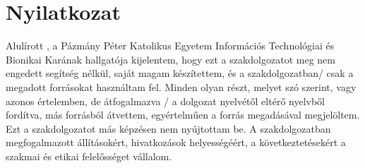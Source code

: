 
\chapter*{Nyilatkozat}
Alulírott \nev, a Pázmány Péter Katolikus Egyetem Információs Technológiai és Bionikai Karának hallgatója kijelentem, hogy ezt a szakdolgozatot meg nem engedett segítség nélkül, saját magam készítettem, és a szakdolgozatban/ csak a megadott forrásokat használtam fel. Minden olyan részt, melyet szó szerint, vagy azonos értelemben, de átfogalmazva / a dolgozat nyelvétől eltérő nyelvből fordítva, más forrásból átvettem, egyértelműen a forrás megadásával megjelöltem. Ezt a szakdolgozatot más képzésen nem nyújtottam be.
A szakdolgozatban megfogalmazott állításokért, hivatkozások helyességéért, a következtetésekért a szakmai és etikai felelősséget vállalom.

\begin{flushright}
	\vspace*{.5cm}\par\noindent\makebox[2.5in]{\hrulefill}
	\par\noindent\makebox[2.5in][c]{\nev}
\end{flushright}

\clearpage